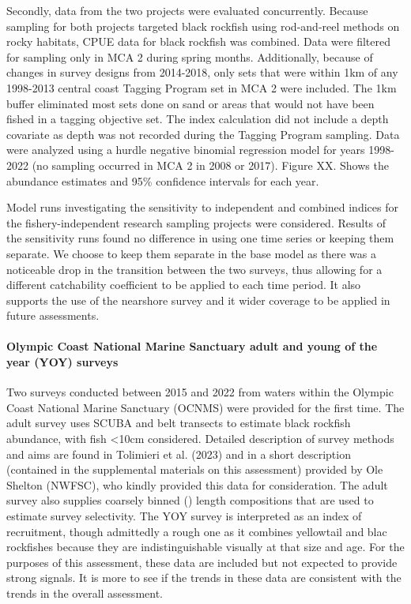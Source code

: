 \documentclass[11pt,
  english,
  letterpaper,
]{article}
\begin{document}
Secondly, data from the two projects were evaluated concurrently. Because sampling for both projects targeted black rockfish using rod-and-reel methods on rocky habitats, CPUE data for black rockfish was combined. Data were filtered for sampling only in MCA 2 during spring months. Additionally, because of changes in survey designs from 2014-2018, only sets that were within 1km of any 1998-2013 central coast Tagging Program set in MCA 2 were included. The 1km buffer eliminated most sets done on sand or areas that would not have been fished in a tagging objective set. The index calculation did not include a depth covariate as depth was not recorded during the Tagging Program sampling. Data were analyzed using a hurdle negative binomial regression model for years 1998-2022 (no sampling occurred in MCA 2 in 2008 or 2017). Figure XX. Shows the abundance estimates and 95\% confidence intervals for each year.

Model runs investigating the sensitivity to independent and combined indices for the fishery-independent research sampling projects were considered. Results of the sensitivity runs found no difference in using one time series or keeping them separate. We choose to keep them separate in the base model as there was a noticeable drop in the transition between the two surveys, thus allowing for a different catchability coefficient to be applied to each time period. It also supports the use of the nearshore survey and it wider coverage to be applied in future assessments.

\hypertarget{olympic-coast-national-marine-sanctuary-adult-and-young-of-the-year-yoy-surveys}{%
\paragraph{Olympic Coast National Marine Sanctuary adult and young of the year (YOY) surveys}\label{olympic-coast-national-marine-sanctuary-adult-and-young-of-the-year-yoy-surveys}}

Two surveys conducted between 2015 and 2022 from waters within the Olympic Coast National Marine Sanctuary (OCNMS) were provided for the first time. The adult survey uses SCUBA and belt transects to estimate black rockfish abundance, with fish \textless10cm considered. Detailed description of survey methods and aims are found in Tolimieri et al. (2023) and in a short description (contained in the supplemental materials on this assessment) provided by Ole Shelton (NWFSC), who kindly provided this data for consideration. The adult survey also supplies coarsely binned () length compositions that are used to estimate survey selectivity. The YOY survey is interpreted as an index of recruitment, though admittedly a rough one as it combines yellowtail and blac rockfishes because they are indistinguishable visually at that size and age. For the purposes of this assessment, these data are included but not expected to provide strong signals. It is more to see if the trends in these data are consistent with the trends in the overall assessment.
\end{document}
